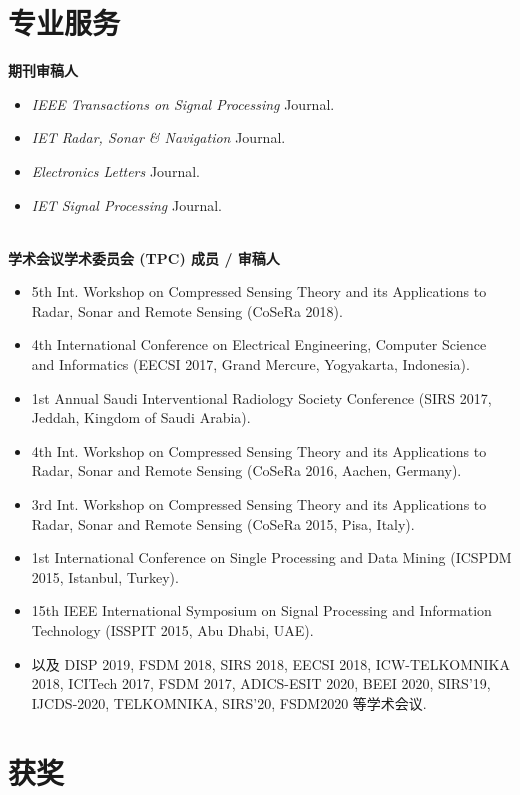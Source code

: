 \documentclass[paper=a4,fontsize=11pt]{scrartcl}
\begin{document}
\section*{专业服务}

\textbf{期刊审稿人} 
\begin{itemize}
	\item \textit{IEEE Transactions on Signal Processing} Journal.
	\item \textit{IET Radar, Sonar \& Navigation} Journal.
	\item \textit{Electronics Letters} Journal.
	\item \textit{IET Signal Processing} Journal.
\end{itemize}
~\\
\textbf{学术会议学术委员会 (TPC) 成员 / 审稿人} 
\begin{itemize}
	\item 5th Int. Workshop on Compressed Sensing Theory and its Applications to Radar, Sonar and Remote Sensing (CoSeRa 2018).
	\item 4th International Conference on Electrical Engineering, Computer Science and Informatics (EECSI 2017, Grand Mercure, Yogyakarta, Indonesia).
	\item 1st Annual Saudi Interventional Radiology Society Conference (SIRS 2017, Jeddah, Kingdom of Saudi Arabia).
	\item 4th Int. Workshop on Compressed Sensing Theory and its Applications to Radar, Sonar and Remote Sensing (CoSeRa 2016, Aachen, Germany).
	\item 3rd Int. Workshop on Compressed Sensing Theory and its Applications to Radar, Sonar and Remote Sensing (CoSeRa 2015, Pisa, Italy).
	\item 1st International Conference on Single Processing and Data Mining (ICSPDM 2015, Istanbul, Turkey).
	\item 15th IEEE International Symposium on Signal Processing and Information Technology (ISSPIT 2015, Abu Dhabi, UAE).
	\item 以及 DISP 2019, FSDM 2018, SIRS 2018, EECSI 2018, ICW-TELKOMNIKA 2018, ICITech 2017, FSDM 2017, ADICS-ESIT 2020, BEEI 2020, SIRS'19, IJCDS-2020, TELKOMNIKA, SIRS'20, FSDM2020 等学术会议. 
\end{itemize}

\section*{获奖}
\end{document}
